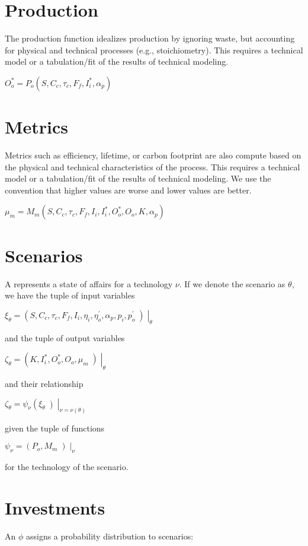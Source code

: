 \documentclass[letterpaper,10pt,english]{sphinxmanual}
\begin{document}
\section{Production}
\label{\detokenize{doc-src/formulation:production}}
The production function idealizes production by ignoring waste, but
accounting for physical and technical processes (e.g., stoichiometry).
This requires a technical model or a tabulation/fit of the results of
technical modeling.

\(O^*_o = P_o(S, C_c, \tau_c, F_f, I^*_i, \alpha_p)\)


\section{Metrics}
\label{\detokenize{doc-src/formulation:metrics}}
Metrics such as efficiency, lifetime, or carbon footprint are also
compute based on the physical and technical characteristics of the
process. This requires a technical model or a tabulation/fit of the
results of technical modeling. We use the convention that higher values
are worse and lower values are better.

\(\mu_m = M_m(S, C_c, \tau_c, F_f, I_i, I^*_i, O^*_o, O_o, K, \alpha_p)\)


\section{Scenarios}
\label{\detokenize{doc-src/formulation:scenarios}}
A  represents a state of affairs for a technology \(\nu\).
If we denote the scenario as \(\theta\), we have the tuple of input
variables

\(\xi_\theta = \left(S, C_c, \tau_c, F_f, I_i, \eta_i, \eta^\prime_o, \alpha_p, p_i, p^\prime_o\middle) \right|_\theta\)

and the tuple of output variables

\(\zeta_\theta = \left(K, I^*_i, O^*_o, O_o, \mu_m\middle) \right|_\theta\)

and their relationship

\(\zeta_\theta = \psi_\nu\left(\xi_\theta\middle) \right|_{\nu = \nu(\theta)}\)

given the tuple of functions

\(\psi_\nu = \left(P_o, M_m\middle) \right|_\nu\)

for the technology of the scenario.


\section{Investments}
\label{\detokenize{doc-src/formulation:investments}}
An  \(\phi\) assigns a probability distribution to
scenarios:
\end{document}
